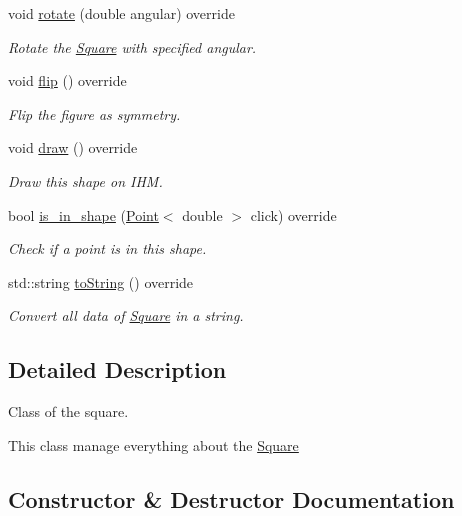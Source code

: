 \begin{DoxyCompactItemize}
void \hyperlink{classSquare_a5714e182c30f996b78e74e1badd054a2}{rotate} (double angular) override
\begin{DoxyCompactList}\small\item\em Rotate the \hyperlink{classSquare}{Square} with specified angular. \end{DoxyCompactList}\item 
\mbox{\label{classSquare_a2d56ff842244af8f2fdc85b7e5ce76f3}} 
void \hyperlink{classSquare_a2d56ff842244af8f2fdc85b7e5ce76f3}{flip} () override
\begin{DoxyCompactList}\small\item\em Flip the figure as symmetry. \end{DoxyCompactList}\item 
\mbox{\label{classSquare_a4edbdf9ae0519cc1823f4dbbaa6bbf4c}} 
void \hyperlink{classSquare_a4edbdf9ae0519cc1823f4dbbaa6bbf4c}{draw} () override
\begin{DoxyCompactList}\small\item\em Draw this shape on I\+HM. \end{DoxyCompactList}\item 
bool \hyperlink{classSquare_a18b130131d969c53f3dfbe2b753a28d4}{is\+\_\+in\+\_\+shape} (\hyperlink{classPoint}{Point}$<$ double $>$ click) override
\begin{DoxyCompactList}\small\item\em Check if a point is in this shape. \end{DoxyCompactList}\item 
std\+::string \hyperlink{classSquare_aa5d7db8004bba3c400f57513d93b21d4}{to\+String} () override
\begin{DoxyCompactList}\small\item\em Convert all data of \hyperlink{classSquare}{Square} in a string. \end{DoxyCompactList}\end{DoxyCompactItemize}


\subsection{Detailed Description}
Class of the square. 

This class manage everything about the \hyperlink{classSquare}{Square} 

\subsection{Constructor \& Destructor Documentation}
\mbox{\label{classSquare_ad5556d633716f2daa1f2f7e3b52073cc}} 
